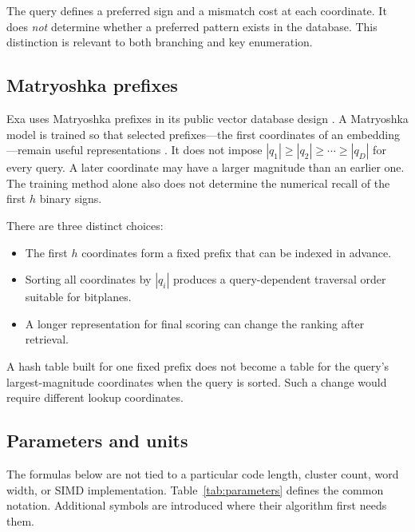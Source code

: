 The query defines a preferred sign and a mismatch cost at each coordinate. It does
\emph{not} determine whether a preferred pattern exists in the database. This distinction is relevant to
both branching and key enumeration.

\subsection{Matryoshka prefixes}
Exa uses Matryoshka prefixes in its public vector database design \cite{exa}.
A Matryoshka model is trained so that selected prefixes---the first coordinates of an
embedding---remain useful representations \cite{mrl}. It does not impose
$|q_1|\geq |q_2|\geq\cdots\geq |q_D|$ for every query. A later coordinate may have a larger
magnitude than an earlier one. The training method alone also does not determine the numerical
recall of the first $h$ binary signs.

There are three distinct choices:
\begin{itemize}
\item The first $h$ coordinates form a fixed prefix that can be indexed in advance.
\item Sorting all coordinates by $|q_i|$ produces a query-dependent traversal order suitable for bitplanes.
\item A longer representation for final scoring can change the ranking after retrieval.
\end{itemize}
A hash table built for one fixed prefix does not become a table for the query's largest-magnitude
coordinates when the query is sorted. Such a change would require different lookup coordinates.

\subsection{Parameters and units}
The formulas below are not tied to a particular code length, cluster count, word width, or
SIMD implementation. Table~\ref{tab:parameters} defines the common notation. Additional symbols are
introduced where their algorithm first needs them.

